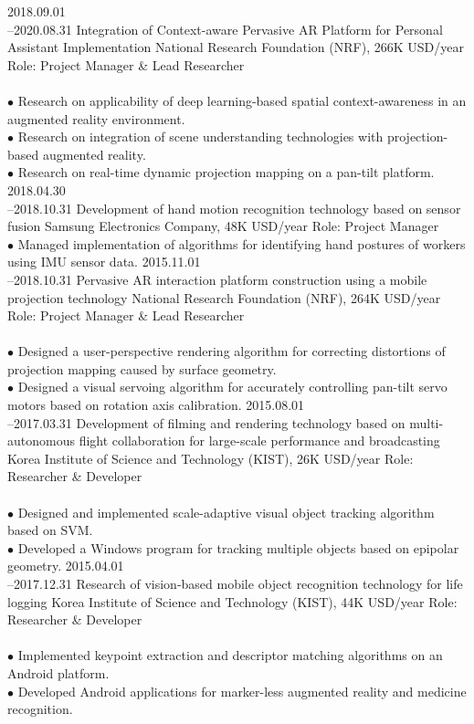\documentclass[]{friggeri-cv}
\begin{document}
\begin{entrylist}
  \entry
    {2018.09.01\\--2020.08.31} %
    {Integration of Context-aware Pervasive AR Platform for Personal Assistant Implementation}
    {National Research Foundation (NRF), 266K USD/year}
    {Role: Project Manager \& Lead Researcher\\
    \\
    $\bullet$ Research on applicability of deep learning-based spatial context-awareness in an augmented reality environment.\\
    $\bullet$ Research on integration of  scene understanding technologies with projection-based augmented reality.\\
    $\bullet$ Research on real-time dynamic projection mapping on a pan-tilt platform.
    }
  \entry
    {2018.04.30\\--2018.10.31}
    {Development of hand motion recognition technology based on sensor fusion}
    {Samsung Electronics Company, 48K USD/year}
    {Role: Project Manager\\
    
    $\bullet$ Managed implementation of algorithms for identifying hand postures of workers using IMU sensor data.
    }
  \entry
    {2015.11.01\\--2018.10.31} 
    {Pervasive AR interaction platform construction using a mobile projection technology}
    {National Research Foundation (NRF), 264K USD/year}
    {Role: Project Manager \& Lead Researcher\\
    \\
    $\bullet$ Designed a user-perspective rendering algorithm for correcting distortions of projection mapping caused by surface geometry.\\
    $\bullet$ Designed  a visual servoing algorithm for accurately controlling pan-tilt servo motors based on rotation axis calibration.
    }
  \entry
    {2015.08.01\\--2017.03.31}
    {Development of filming and rendering technology based on multi-autonomous flight collaboration for large-scale performance and broadcasting}
    {Korea Institute of Science and Technology (KIST), 26K USD/year}
    {Role: Researcher \& Developer\\
    \\
    $\bullet$ Designed and implemented scale-adaptive visual object tracking algorithm based on SVM.\\
    $\bullet$ Developed a Windows program for tracking multiple objects based on epipolar geometry.
    }
  \entry
    {2015.04.01\\--2017.12.31}
    {Research of vision-based mobile object recognition technology for life logging}
    {Korea Institute of Science and Technology (KIST), 44K USD/year}
    {Role: Researcher \& Developer\\
    \\
    $\bullet$ Implemented keypoint extraction and descriptor matching algorithms on an Android platform.\\
    $\bullet$ Developed Android applications for marker-less augmented reality and medicine recognition.
    }
\end{entrylist}
\end{document}
